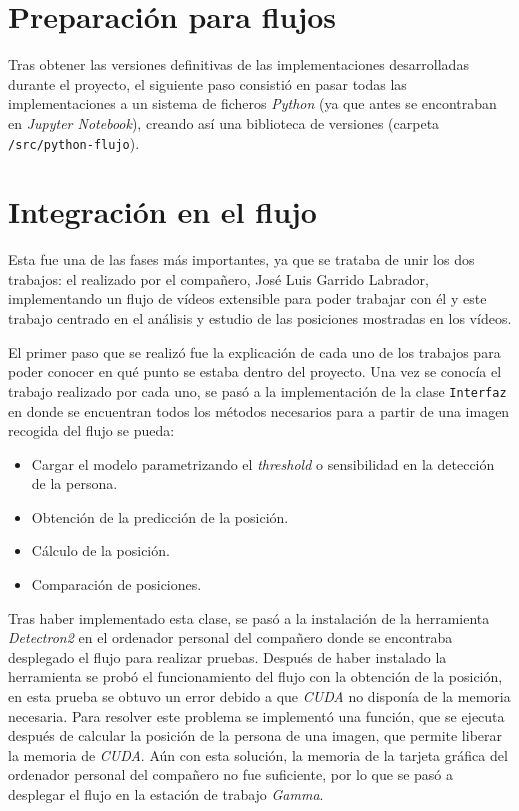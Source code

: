 {\section{Preparación para flujos}
Tras obtener las versiones definitivas de las implementaciones desarrolladas durante el proyecto, el siguiente paso consistió en pasar todas las implementaciones a un sistema de ficheros \textit{Python} (ya que antes se encontraban en \textit{Jupyter Notebook}), creando así una biblioteca de versiones (carpeta \texttt{/src/python-flujo}).

\section{Integración en el flujo}
Esta fue una de las fases más importantes, ya que se trataba de unir los dos trabajos: el realizado por el compañero, José Luis Garrido Labrador, implementando un flujo de vídeos extensible para poder trabajar con él y este trabajo centrado en el análisis y estudio de las posiciones mostradas en los vídeos.

El primer paso que se realizó fue la explicación de cada uno de los trabajos para poder conocer en qué punto se estaba dentro del proyecto. Una vez se conocía el trabajo realizado por cada uno, se pasó a la implementación de la clase \texttt{Interfaz} en donde se encuentran todos los métodos necesarios para a partir de una imagen recogida del flujo se pueda:
\begin{itemize}
	\item Cargar el modelo parametrizando el \textit{threshold} o sensibilidad en la detección de la persona.
	\item Obtención de la predicción de la posición.
	\item Cálculo de la posición.
	\item Comparación de posiciones.
\end{itemize}

Tras haber implementado esta clase, se pasó a la instalación de la herramienta \textit{Detectron2} en el ordenador personal del compañero donde se encontraba desplegado el flujo para realizar pruebas. Después de haber instalado la herramienta se probó el funcionamiento del flujo con la obtención de la posición, en esta prueba se obtuvo un error debido a que \textit{CUDA} no disponía de la memoria necesaria. Para resolver este problema se implementó una función, que se ejecuta después de calcular la posición de la persona de una imagen, que permite liberar la memoria de \textit{CUDA}. Aún con esta solución, la memoria de la tarjeta gráfica del ordenador personal del compañero no fue suficiente, por lo que se pasó a desplegar el flujo en la estación de trabajo \textit{Gamma}.

}
